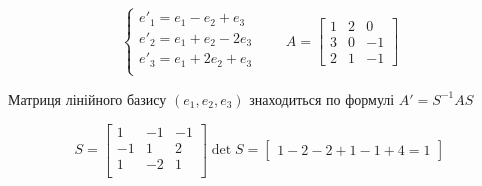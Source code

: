 {}


$$
\begin{cases}
    e'_1=e_1-e_2+e_3 \\
    e'_2=e_1+e_2-2e_3 \\
    e'_3=e_1+2e_2+e_3 \\
  \end{cases}
  \qquad
A =
\begin{bmatrix}
  1 & 2 & 0 \\
  3 & 0 & -1 \\
  2 & 1 & -1
\end{bmatrix}
$$

Матриця лінійного базису $(e_1, e_2, e_3)$ знаходиться по формулі $A'=S^{-1}AS$

$$
S = \begin{bmatrix}
  1& -1& -1 \\
 -1&  1&  2 \\
  1& -2&  1 \\
  \end{bmatrix}
\det{S} =
\begin{bmatrix}
  1-2-2+1-1+4 = 1
  \end{bmatrix}
$$

